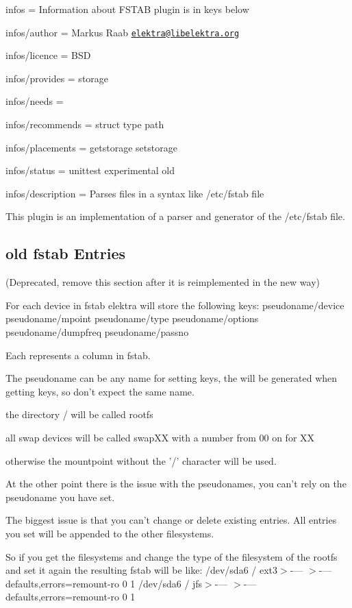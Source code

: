 
\begin{DoxyItemize}
\item infos = Information about F\+S\+T\+A\+B plugin is in keys below
\item infos/author = Markus Raab \href{mailto:elektra@libelektra.org}{\tt elektra@libelektra.\+org}
\item infos/licence = B\+S\+D
\item infos/provides = storage
\item infos/needs =
\item infos/recommends = struct type path
\item infos/placements = getstorage setstorage
\item infos/status = unittest experimental old
\item infos/description = Parses files in a syntax like /etc/fstab file
\end{DoxyItemize}

This plugin is an implementation of a parser and generator of the /etc/fstab file.

\subsection*{old fstab Entries}

(Deprecated, remove this section after it is reimplemented in the new way)

For each device in fstab elektra will store the following keys\+: pseudoname/device pseudoname/mpoint pseudoname/type pseudoname/options pseudoname/dumpfreq pseudoname/passno

Each represents a column in fstab.

The pseudoname can be any name for setting keys, the will be generated when getting keys, so don't expect the same name.

the directory / will be called rootfs

all swap devices will be called swap\+X\+X with a number from 00 on for X\+X

otherwise the mountpoint without the '/' character will be used.

At the other point there is the issue with the pseudonames, you can't rely on the pseudoname you have set.

The biggest issue is that you can't change or delete existing entries. All entries you set will be appended to the other filesystems.

So if you get the filesystems and change the type of the filesystem of the rootfs and set it again the resulting fstab will be like\+: /dev/sda6 / ext3$>$-\/--- $>$-\/---defaults,errors=remount-\/ro 0 1 /dev/sda6 / jfs$>$-\/--- $>$-\/---defaults,errors=remount-\/ro 0 1

